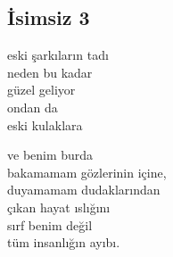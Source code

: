 \subsection{İsimsiz 3}

eski şarkıların tadı \\
neden bu kadar \\
güzel geliyor \\
ondan da \\
eski kulaklara

\noindent\newline
ve benim burda \\
bakamamam gözlerinin içine, \\
duyamamam dudaklarından \\
çıkan hayat ıslığını \\
sırf benim değil \\
tüm insanlığın ayıbı.